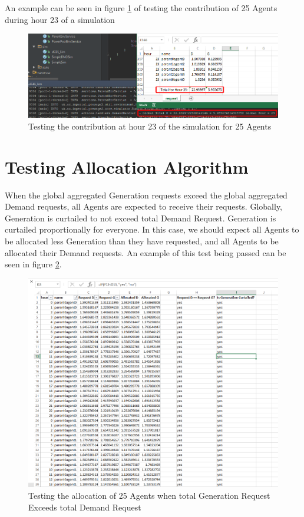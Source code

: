 An example can be seen in figure \ref{fig:test1} of testing the contribution of 25 Agents during hour 23 of a simulation

\clearpage

\begin{figure}[h!]
	\centering
	\includegraphics[scale=0.4]{Images/test-contribution.png}
	\caption{Testing the contribution at hour 23 of the simulation for 25 Agents}
	\label{fig:test1}
\end{figure}



\section*{Testing Allocation Algorithm}
When the global aggregated Generation requests exceed the global aggregated Demand requests, all Agents are expected to receive their requests. Globally, Generation is curtailed to not exceed total Demand Request. Generation is curtailed proportionally for everyone. In this case, we should expect all Agents to be allocated less Generation than they have requested, and all Agents to be allocated their Demand requests. An example of this test being passed can be seen in figure \ref{fig:test2}. \\

\begin{figure}[h!]
	\centering
	\includegraphics[scale=0.4]{Images/test-allocation1.png}
	\caption{Testing the allocation of 25 Agents when total Generation Request Exceeds total Demand Request}
	\label{fig:test2}
\end{figure}

